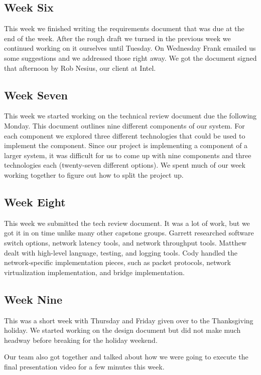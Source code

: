 \documentclass[10pt,onecolumn,journal,draftclsnofoot]{IEEEtran}
\begin{document}
\subsection{Week Six}

This week we finished writing the requirements document that was due at the end
of the week. After the rough draft we turned in the previous week we continued
working on it ourselves until Tuesday. On Wednesday Frank emailed us some
suggestions and we addressed those right away. We got the document signed that
afternoon by Rob Nesius, our client at Intel.

\subsection{Week Seven}

This week we started working on the technical review document due the following
Monday. This document outlines nine different components of our system. For each
component we explored three different technologies that could be used to
implement the component. Since our project is implementing a component of a
larger system, it was difficult for us to come up with nine components and three
technologies each (twenty-seven different options). We spent much of our week
working together to figure out how to split the project up.

\subsection{Week Eight}

This week we submitted the tech review document. It was a lot of work, but we
got it in on time unlike many other capstone groups. Garrett researched software
switch options, network latency tools, and network throughput tools. Matthew
dealt with high-level language, testing, and logging tools. Cody handled the
network-specific implementation pieces, such as packet protocols, network
virtualization implementation, and bridge implementation.

\subsection{Week Nine}

This was a short week with Thursday and Friday given over to the Thanksgiving
holiday. We started working on the design document but did not make much headway
before breaking for the holiday weekend.

Our team also got together and talked about how we were going to execute the
final presentation video for a few minutes this week.
\end{document}
